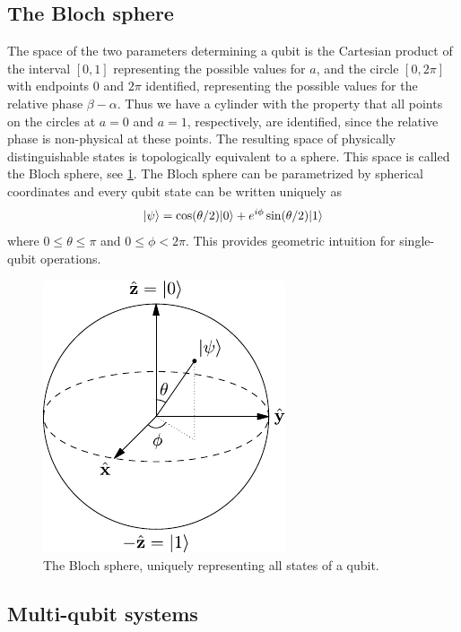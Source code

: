 \subsection{The Bloch sphere}

The space of the two parameters determining a qubit is the Cartesian product of the interval $[0,1]$ representing the possible values for $a$, and the circle $[0,2\pi]$ with endpoints $0$ and $2\pi$ identified, representing the possible values for the relative phase $\beta - \alpha$. Thus we have a cylinder with the property that all points on the circles at $a = 0$ and $a = 1$, respectively, are identified, since the relative phase is non-physical at these points. The resulting space of physically distinguishable states is topologically equivalent to a sphere. This space is called the Bloch sphere, see \cref{fig:bloch sphere}. The Bloch sphere can be parametrized by spherical coordinates and every qubit state can be written uniquely as
\begin{equation}
  \lvert\psi\rangle = \cos(\theta/2) \lvert0\rangle + e^{i\phi}\sin(\theta/2) \lvert1\rangle
\end{equation}
where $0 \le \theta \le \pi$ and $0 \le \phi < 2\pi$. This provides geometric intuition for single-qubit operations.

\begin{figure}[!htb]
  \centering
  \includegraphics{img/bloch-sphere.pdf}
  \caption{The Bloch sphere, uniquely representing all states of a qubit.}
  \label{fig:bloch sphere}
\end{figure}



\subsection{Multi-qubit systems}

